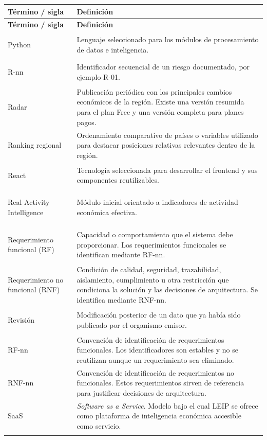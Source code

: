 \documentclass[11pt,a4paper]{article}
\makeatletter
\newcommand{\proyectoNombre}{LEIP}
\newenvironment{glosario}{%
  \renewcommand{\arraystretch}{1.18}%
  \begin{longtable}{@{}>{\raggedright\arraybackslash\bfseries}p{4.0cm} >{\raggedright\arraybackslash}p{10.7cm}@{}}
  \toprule
  \textbf{T\'ermino / sigla} & \textbf{Definici\'on} \\
  \midrule
  \endfirsthead
  \toprule
  \textbf{T\'ermino / sigla} & \textbf{Definici\'on} \\
  \midrule
  \endhead
  \bottomrule
  \endfoot
}{%
  \end{longtable}
  \renewcommand{\arraystretch}{1}%
}
\makeatother
\begin{document}
\begin{glosario}
Python & Lenguaje seleccionado para los m\'odulos de procesamiento de datos e inteligencia. \\
\addlinespace

R-nn & Identificador secuencial de un riesgo documentado, por ejemplo R-01. \\
\addlinespace

Radar & Publicaci\'on peri\'odica con los principales cambios econ\'omicos de la regi\'on. Existe una versi\'on resumida para el plan Free y una versi\'on completa para planes pagos. \\
\addlinespace

Ranking regional & Ordenamiento comparativo de pa\'ises o variables utilizado para destacar posiciones relativas relevantes dentro de la regi\'on. \\
\addlinespace

React & Tecnolog\'ia seleccionada para desarrollar el frontend y sus componentes reutilizables. \\
\addlinespace

Real Activity Intelligence & M\'odulo inicial orientado a indicadores de actividad econ\'omica efectiva. \\
\addlinespace

Requerimiento funcional (RF) & Capacidad o comportamiento que el sistema debe proporcionar. Los requerimientos funcionales se identifican mediante RF-nn. \\
\addlinespace

Requerimiento no funcional (RNF) & Condici\'on de calidad, seguridad, trazabilidad, aislamiento, cumplimiento u otra restricci\'on que condiciona la soluci\'on y las decisiones de arquitectura. Se identifica mediante RNF-nn. \\
\addlinespace

Revisi\'on & Modificaci\'on posterior de un dato que ya hab\'ia sido publicado por el organismo emisor. \\
\addlinespace

RF-nn & Convenci\'on de identificaci\'on de requerimientos funcionales. Los identificadores son estables y no se reutilizan aunque un requerimiento sea eliminado. \\
\addlinespace

RNF-nn & Convenci\'on de identificaci\'on de requerimientos no funcionales. Estos requerimientos sirven de referencia para justificar decisiones de arquitectura. \\
\addlinespace

SaaS & \emph{Software as a Service}. Modelo bajo el cual \proyectoNombre{} se ofrece como plataforma de inteligencia econ\'omica accesible como servicio. \\
\addlinespace


\end{glosario}
\end{document}
